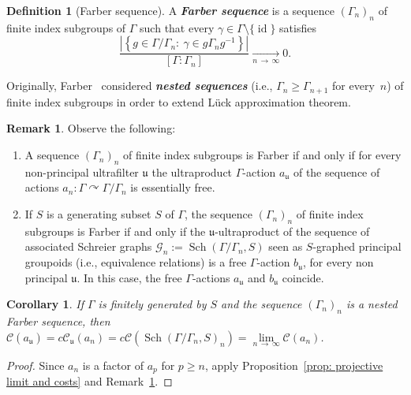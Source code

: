 \documentclass[10pt]{amsart}
\newtheorem{coro}[cdrthm]{Corollary}
\theoremstyle{definition}
\newtheorem{rema}[cdrthm]{Remark}
\newtheorem{defi}[cdrthm]{Definition}
\newcommand{\defin}[1]{\textbf{\emph{#1}}}
\newcommand{\acting}{\curvearrowright}
\newcommand{\cost}{\mathcal{C}}
\newcommand{\ccost}{c\mathcal{C}}
\newcommand{\cg}{\mathcal{G}}
\DeclareMathOperator{\id}{id}
\DeclareMathOperator{\Sch}{Sch}
\newcommand{\ul}{\mathfrak{u}}
\begin{document}
\begin{defi}[Farber sequence]\label{def: Farber sequence}
A
\defin{Farber sequence} is a sequence $(\Gamma_n)_n$ of finite index subgroups of $\Gamma$ such that every $\gamma\in \Gamma\setminus\{\id\}$ satisfies
\begin{equation*}
\frac{\left|\left\lbrace g\in \Gamma/\Gamma_n:\ \gamma\in g\Gamma_ng^{-1}
\right\rbrace\right|}{[\Gamma:\Gamma_n]}\underset{n\,\to\,\infty}{\longrightarrow} 0.
\end{equation*}
\end{defi}

Originally, Farber~\cite{Farber-1998-L2-approx} considered
\defin{nested sequences} (i.e., $\Gamma_n\geq \Gamma_{n+1}$ for every~$n$) of finite index subgroups in order to extend L\"uck approximation theorem.


\begin{rema}\label{rem: Farber vs free ultralim act}
Observe the following:
\begin{enumerate}
\item \label{rema4.8.1} A sequence $(\Gamma_n)_n$ of finite index subgroups is Farber if and only if for every non-principal ultrafilter $\ul$ the ultraproduct $\Gamma$-action $a_{\ul}$ of the sequence of actions $a_n: \Gamma \acting \Gamma/\Gamma_n$ is essentially free.

\item \label{rema4.8.2}If $S$ is a generating subset $S$ of $\Gamma$, the sequence $(\Gamma_n)_n$ of finite index subgroups is Farber if and only if the $\ul$-ultraproduct of the sequence of associated Schreier graphs $\cg_n:=\Sch(\Gamma/\Gamma_n, S)$ seen as $S$-graphed principal groupoids (i.e., equivalence relations) is a free $\Gamma$-action $b_{\ul}$, for every non principal $\ul$. In this case, the free $\Gamma$-actions $a_{\ul}$ and $b_{\ul}$ coincide.
\end{enumerate}
\end{rema}



\begin{coro}\label{cor: nested Farber seq}
If $\Gamma$ is finitely generated by $S$ and the sequence $(\Gamma_n)_n$ is a nested Farber sequence, then $\cost(a_{\ul})=\ccost_{\ul}(a_n)=\ccost(\Sch(\Gamma/\Gamma_n, S)_n)=\lim\limits_{n\,\to\,\infty} \cost(a_n)$.
\end{coro}

\begin{proof}
Since $a_n$ is a factor of $a_p$ for $p\geq n$, apply Proposition~\ref{prop: projective limit and costs} and Remark~\ref{rem: Farber vs free ultralim act}.
\end{proof}
\end{document}
